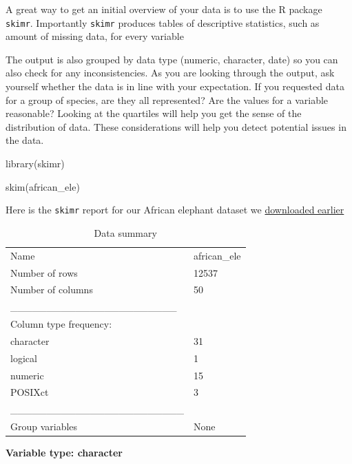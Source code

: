 \documentclass[
  letterpaper,
  DIV=11,
  numbers=noendperiod,
  oneside]{scrreprt}
\newenvironment{Shaded}{\begin{snugshade}}{\end{snugshade}}
\newcommand{\FunctionTok}[1]{\textcolor[rgb]{0.28,0.35,0.67}{#1}}
\newcommand{\NormalTok}[1]{\textcolor[rgb]{0.00,0.23,0.31}{#1}}
\begin{document}
A great way to get an initial overview of your data is to use the R
package \texttt{skimr}. Importantly \texttt{skimr} produces tables of
descriptive statistics, such as amount of missing data, for every
variable

The output is also grouped by data type (numeric, character, date) so
you can also check for any inconsistencies. As you are looking through
the output, ask yourself whether the data is in line with your
expectation. If you requested data for a group of species, are they all
represented? Are the values for a variable reasonable? Looking at the
quartiles will help you get the sense of the distribution of data. These
considerations will help you detect potential issues in the data.

\begin{Shaded}
\begin{Highlighting}[]
\FunctionTok{library}\NormalTok{(skimr)}

\FunctionTok{skim}\NormalTok{(african\_ele)}
\end{Highlighting}
\end{Shaded}

Here is the \texttt{skimr} report for our African elephant dataset we
\protect\hyperlink{sec-download-data}{downloaded earlier}

\begin{longtable}[]{@{}ll@{}}
\caption{Data summary}\tabularnewline
\toprule()
\endhead
Name & african\_ele \\
Number of rows & 12537 \\
Number of columns & 50 \\
\_\_\_\_\_\_\_\_\_\_\_\_\_\_\_\_\_\_\_\_\_\_\_ & \\
Column type frequency: & \\
character & 31 \\
logical & 1 \\
numeric & 15 \\
POSIXct & 3 \\
\_\_\_\_\_\_\_\_\_\_\_\_\_\_\_\_\_\_\_\_\_\_\_\_ & \\
Group variables & None \\
\bottomrule()
\end{longtable}

\textbf{Variable type: character}
\end{document}
